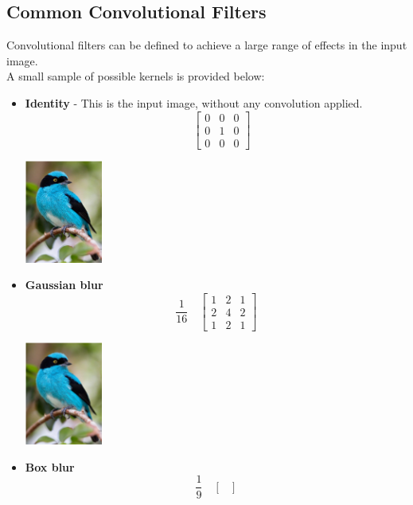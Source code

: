 \subsection{Common Convolutional Filters}
\label{sec:convolution:convolutionalfilters:commonconvolutionalfilters}
Convolutional filters can be defined to achieve a large range of effects in the input image.\\
A small sample of possible kernels is provided below:\\
\begin{itemize}
    \item \textbf{Identity} - This is the input image, without any convolution applied.
    $$
    \quad
    \begin{bmatrix} 
    0 & 0 & 0 \\
    0 & 1 & 0 \\
    0 & 0 & 0
    \end{bmatrix}
    $$
    \begin{center}
	\includegraphics[width=1in]{graphics/convolution/Convolution_gebs_KernelIdentity.png}
    \end{center}
    \item \textbf{Gaussian blur}
    $$
    \frac{1}{16}
    \quad
    \begin{bmatrix} 
    1 & 2 & 1 \\
    2 & 4 & 2 \\
    1 & 2 & 1
    \end{bmatrix}
    $$
    \begin{center}
	\includegraphics[width=1in]{graphics/convolution/Convolution_gebs_KernelGaussianBlur3x3.png}
    \end{center}
    \item \textbf{Box blur}
    $$
    \frac{1}{9}
    \quad
    \begin{bmatrix} 

\end{bmatrix}$$
\end{itemize}
